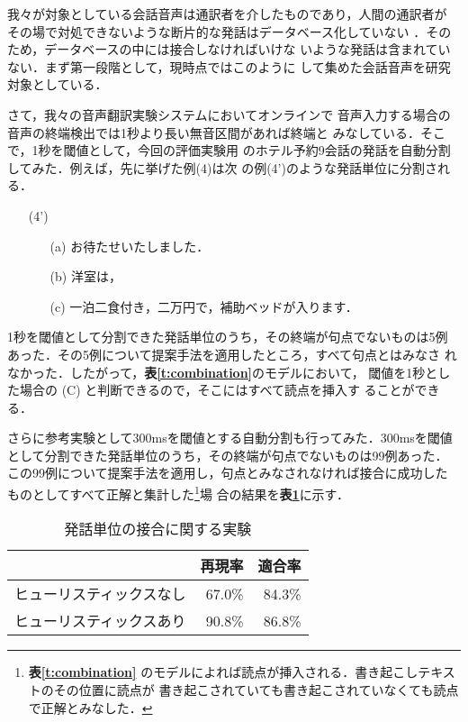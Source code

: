 我々が対象としている会話音声は通訳者を介したものであり，人間の通訳者が
その場で対処できないような断片的な発話はデータベース化していない
\cite{Morimoto94}．そのため，データベースの中には接合しなければいけな
いような発話は含まれていない．まず第一段階として，現時点ではこのように
して集めた会話音声を研究対象としている．

さて，我々の音声翻訳実験システム\cite{Takezawa98a}においてオンラインで
音声入力する場合の音声の終端検出では1秒より長い無音区間があれば終端と
みなしている\cite{Reaves98}．そこで，1秒を閾値として，今回の評価実験用
のホテル予約9会話の発話を自動分割してみた．例えば，先に挙げた例(4)は次
の例(4')のような発話単位に分割される．

\begin{itemize}
\item[(4')] 
\begin{itemize}
\item[(a)] お待たせいたしました．
\item[(b)] 洋室は，
\item[(c)] 一泊二食付き，二万円で，補助ベッドが入ります．
\end{itemize}
\end{itemize}

1秒を閾値として分割できた発話単位のうち，その終端が句点でないものは5例
あった．その5例について提案手法を適用したところ，すべて句点とはみなさ
れなかった．したがって，{\bf\dg 表\ref{t:combination}}のモデルにおいて，
閾値を1秒とした場合の (C) と判断できるので，そこにはすべて読点を挿入す
ることができる．

さらに参考実験として300msを閾値とする自動分割も行ってみた．300msを閾値
として分割できた発話単位のうち，その終端が句点でないものは99例あった．
この99例について提案手法を適用し，句点とみなされなければ接合に成功した
ものとしてすべて正解と集計した\footnote{{\bf\dg 表\ref{t:combination}}
のモデルによれば読点が挿入される．書き起こしテキストのその位置に読点が
書き起こされていても書き起こされていなくても読点で正解とみなした．}場
合の結果を{\bf\dg 表\ref{t:connect}}に示す．

\begin{table}
\caption{発話単位の接合に関する実験}\label{t:connect}
\begin{center}
\begin{tabular}{|l||r|r|}
\hline
                         & 再現率 & 適合率 \\
\hline\hline
ヒューリスティックスなし & 67.0\% & 84.3\% \\
\hline
ヒューリスティックスあり & 90.8\% & 86.8\% \\
\hline
\end{tabular}
\end{center}
\end{table}

